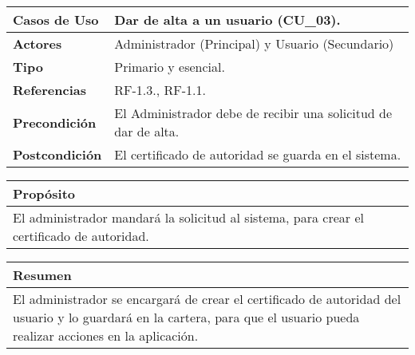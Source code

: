 \begin{itemize}
    \begin{table}[h!]
        \centering
        \begin{tabular}{|l|p{}|}
            \hline
            \textbf{Casos de Uso}   &   Dar de alta a un usuario (CU\_03). \\
            \hline 
            \textbf{Actores}        &   Administrador (Principal) y Usuario (Secundario)\\ 
            \hline 
            \textbf{Tipo}           &   Primario y esencial. \\ 
            \hline
            \textbf{Referencias}    &   RF-1.3., RF-1.1. \\ 
            \hline
            \textbf{Precondición}   &   El Administrador debe de recibir una solicitud de dar de alta. \\ 
            \hline
            \textbf{Postcondición}  &   El certificado de autoridad se guarda en el sistema. \\ 
            \hline
        \end{tabular}
        
        \vspace{5mm}
        
        \begin{tabular}{|p{\textwidth}|}
            \hline
            \rowcolor{SeaGreen} \textbf{Propósito} \\
            \hline
            \multicolumn{1}{|p{12cm}|}{El administrador mandará la solicitud al sistema, para crear el certificado de autoridad.} \\ [0.5ex]
            \hline
        \end{tabular}
        
        \vspace{5mm}
        
        \begin{tabular}{|p{\textwidth}|}
            \hline
            \rowcolor{SeaGreen} \textbf{Resumen} \\
            \hline
            \multicolumn{1}{|p{12cm}|}{El administrador se encargará de crear el certificado de autoridad del usuario y
            lo guardará en la cartera, para que el usuario pueda realizar acciones en la aplicación.} \\ [0.5ex]
            \hline
        \end{tabular}
        
        \vspace{5mm}
        

\end{table}
\end{itemize}
